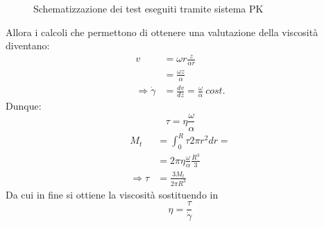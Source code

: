 \begin{figure}
\centering
{}\quad
{}
\caption{Schematizzazione dei test eseguiti tramite sistema \ac{PK}}
\label{fig:TestPK}
\end{figure}
Allora i calcoli che permettono di ottenere una valutazione della viscosità diventano:
\begin{align}
v &= \omega r \frac{z}{\alpha r}\\
&= \frac{\omega z}{\alpha}\\
\Rightarrow \dot{\gamma} &= \frac{dv}{dz} = \frac{\omega}{\alpha}\: cost.
\end{align}
Dunque:
\begin{equation}
\tau = \eta \frac{\omega}{\alpha}
\end{equation}
\begin{align}
M_t &= \int_0^R \tau 2\pi r^2 dr =\\
&= 2\pi \eta \frac{\omega}{\alpha} \frac{R^3}{3}\\
\Rightarrow \tau &= \frac{3 M_t}{2\pi R^3}
\end{align}
Da cui in fine si ottiene la viscosità sostituendo in
\begin{equation}
\eta = \frac{\tau}{\dot{\gamma}}
\end{equation}

